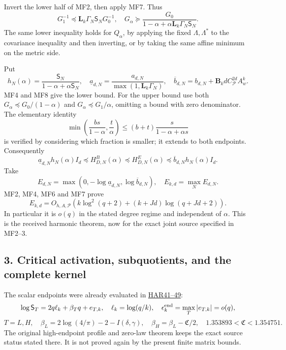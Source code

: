 \documentclass[11pt]{article}
\begin{document}
Invert the lower half of MF2, then apply MF7. Thus \[
G_1^{-1}\preceq \mathbf L_k\Gamma_N\mathsf S_N G_0^{-1},
\quad
G_\alpha\succeq\frac{G_0}
 {1-\alpha+\alpha\mathbf L_k\Gamma_N\mathsf S_N}.
\tag{MF8}
\] The same lower inequality holds for \(Q_\alpha\), by applying the fixed \(\Lambda,\Lambda^*\) to the covariance inequality and then inverting, or by taking the same affine minimum on the metric side.

Put \[
h_N(\alpha)=\frac{\mathsf S_N}{1-\alpha+\alpha\mathsf S_N},\quad
\underline a_{d,N}=\frac{a_{d,N}}{\max(1,\mathbf L_k\Gamma_N)},\quad
\overline b_{d,N}=b_{d,N}+\mathbf B_kdC_{\mathscr P}^{2d}A_w^k.
\] MF4 and MF8 give the lower bound. For the upper bound use both \(G_\alpha\preceq G_0/(1-\alpha)\) and \(G_\alpha\preceq G_1/\alpha\), omitting a bound with zero denominator. The elementary identity \[
\min\left(\frac{bs}{1-\alpha},\frac t\alpha\right)
\le(b+t)\frac{s}{1-\alpha+\alpha s}
\] is verified by considering which fraction is smaller; it extends to both endpoints. Consequently \[
\boxed{
\underline a_{d,N}h_N(\alpha)I_d
\preceq H^B_{D,N}(\alpha)\preceq H^E_{D,N}(\alpha)
\preceq\overline b_{d,N}h_N(\alpha)I_d.}
\tag{MF9}
\] Take \[
E_{d,N}=\max(0,-\log\underline a_{d,N},\log\overline b_{d,N}),\quad
E_{k,d}=\max_NE_{d,N}.
\] MF2, MF4, MF6 and MF7 prove \[
E_{k,d}=O_{h,A,\mathscr P}
\left(k\log^2(q+2)+(k+Jd)\log(q+Jd+2)\right).
\tag{MF10}
\] In particular it is \(o(q)\) in the stated degree regime and independent of \(\alpha\). This is the received harmonic theorem, now for the exact joint source specified in MF2--3.

\subsection{3. Critical activation, subquotients, and the complete kernel}\label{critical-activation-subquotients-and-the-complete-kernel}

The scalar endpoints were already evaluated in \href{https://github.com/KokunoYumeto/zeta-function-research-reader/blob/360d3c1d798da434966d35f7e407fc59c14f234b/workbenches/splitzero-tandem/continuations/20260921-critical-inverse-activation/HARMONIC_PROOFS.md\#L459}{HAR41--49}: \[
\log\mathsf S_T=2q\ell_k+\beta_Tq+e_{T,k},\quad
\ell_k=\log(q/k),\quad \epsilon_k^{\rm end}=\max_T|e_{T,k}|=o(q),
\] \[
T=L,H,\quad
\beta_L=2\log(4/\pi)-2-I(\delta,\gamma),\quad
\beta_H=\beta_L-\mathfrak C/2,\quad
1.353893<\mathfrak C<1.354751.
\tag{MF11}
\] The original high-endpoint profile and zero-law theorem keeps the exact source status stated there. It is not proved again by the present finite matrix bounds.
\end{document}
